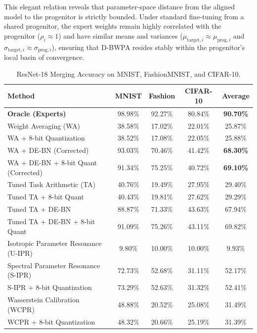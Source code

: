 \documentclass{article}
\theoremstyle{plain}
\theoremstyle{definition}
\theoremstyle{remark}
\begin{document}
This elegant relation reveals that parameter-space distance from the aligned model to the progenitor is strictly bounded. Under standard fine-tuning from a shared progenitor, the expert weights remain highly correlated with the progenitor ($\rho_i \approx 1$) and have similar means and variances ($\mu_{\mathrm{target}, i} \approx \mu_{\mathrm{prog}, i}$ and $\sigma_{\mathrm{target}, i} \approx \sigma_{\mathrm{prog}, i}$), ensuring that D-BWPA resides stably within the progenitor's local basin of convergence.

\begin{table}[t]
\caption{ResNet-18 Merging Accuracy on MNIST, FashionMNIST, and CIFAR-10.}
\label{tab:resnet}
\vskip 0.05in
\begin{center}
\begin{footnotesize}
\begin{sc}
\setlength{\tabcolsep}{1.5pt}
\begin{tabular}{lcccc}
\toprule
Method & MNIST & Fashion & CIFAR-10 & Average \\
\midrule
\textbf{Oracle (Experts)} & 98.98\% & 92.27\% & 80.84\% & \textbf{90.70\%} \\
\midrule
Weight Averaging (WA) & 38.58\% & 17.02\% & 22.01\% & 25.87\% \\
WA + 8-bit Quantization & 38.52\% & 17.08\% & 22.05\% & 25.88\% \\
WA + DE-BN (Corrected) & 93.03\% & 70.46\% & 41.42\% & \textbf{68.30\%} \\
WA + DE-BN + 8-bit Quant (Corrected) & 91.34\% & 75.25\% & 40.72\% & \textbf{69.10\%} \\
\midrule
Tuned Task Arithmetic (TA) & 40.76\% & 19.49\% & 27.95\% & 29.40\% \\
Tuned TA + 8-bit Quant & 40.43\% & 19.81\% & 27.62\% & 29.29\% \\
Tuned TA + DE-BN & 88.87\% & 71.33\% & 43.63\% & 67.94\% \\
Tuned TA + DE-BN + 8-bit Quant & 91.09\% & 75.26\% & 43.11\% & 69.82\% \\
\midrule
Isotropic Parameter Resonance (U-IPR) & 9.80\% & 10.00\% & 10.00\% & 9.93\% \\
Spectral Parameter Resonance (S-IPR) & 72.73\% & 52.68\% & 31.11\% & 52.17\% \\
S-IPR + 8-bit Quantization & 73.29\% & 52.63\% & 31.32\% & 52.41\% \\
Wasserstein Calibration (WCPR) & 48.88\% & 20.52\% & 25.08\% & 31.49\% \\
WCPR + 8-bit Quantization & 48.32\% & 20.66\% & 25.19\% & 31.39\% \\

\end{tabular}
\end{sc}
\end{footnotesize}
\end{center}
\end{table}
\end{document}
